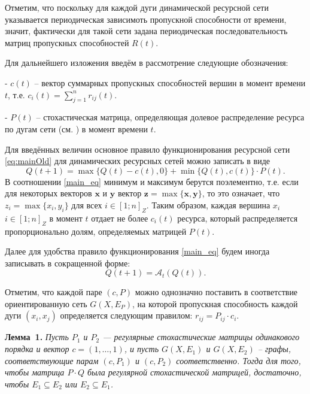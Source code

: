 \documentclass[a4paper,12pt]{article}
\begin{document}
Отметим, что поскольку для каждой дуги динамической ресурсной сети указывается периодическая зависимоть пропускной способности от времени, значит, фактически для такой сети задана периодическая последовательность матриц пропускных способностей ${R}(t)$. 

Для дальнейшего изложения введём в рассмотрение следующие обозначения:

	- ${c}(t)$ -- вектор суммарных пропускных способностей вершин в момент времени $t$, т.е. $c_i(t)=\sum\limits_{j=1}^n r_{ij}(t)$.
	
	- ${P}(t)$ -- стохастическая матрица, определяющая долевое распределение ресурса по дугам сети (см. \cite{SvSkor:KuznZhil1}) в момент времени $t$.


Для введённых величин основное правило функционирования ресурсной сети \eqref{eq:mainOld} для динамических ресурсных сетей можно записать в виде
    \begin{equation}
    \label{main_eq}
    	{Q}(t+1) = \max\{{Q}(t) - {c}(t), {0}\} + \min\{{Q}(t), {c}(t)\} \cdot {P}(t).
    \end{equation}
В соотношении \eqref{main_eq} минимум и максимум берутся поэлементно, т.е. если для некоторых векторов $\mathbf{x}$ и $\mathbf{y}$ вектор $\mathbf{z}=\max\{\mathbf{x},\mathbf{y}\}$, то это означает, что $z_i=\max\{x_i,y_i\}$ для всех $i\in[1;n]_Z$. Таким образом, каждая вершина $x_i$ $i\in [1;n]_Z$ в момент $t$ отдает не более  $c_i(t)$ ресурса, который распределяется пропорционально долям, определяемых матрицей ${P}(t)$.


Далее для удобства правило функционирования \eqref{main_eq} будем иногда записывать в сокращенной форме:
\begin{equation*}
	{Q}(t + 1) = \mathcal{A}_t({Q}(t)).
\end{equation*}

Отметим, что каждой паре $({c}, {P})$ можно однозначно поставить в соответствие ориентированную сеть $G(X,E_P)$, на которой пропускная способность каждой дуги $(x_i,x_j)$ определяется следующим правилом: $r_{ij} = P_{ij} \cdot c_i$.   

{\bf Лемма~1. }{\it 
	Пусть ${P}_1$ и ${P}_2$ --- регулярные стохастические матрицы одинакового порядка и вектор ${c}=(1,\dots,1)$, и пусть $G(X, E_1)$ и $G(X,E_2)$ -- графы, соответствующие парам $({c}, {P}_1)$ и $({c}, {P}_2)$ соответственно. Тогда для того, чтобы матрица ${P} \cdot {Q}$ была регулярной стохастической матрицей, достаточно, чтобы $E_1 \subseteq E_2$ или $E_2 \subseteq E_1$.
}
\end{document}
